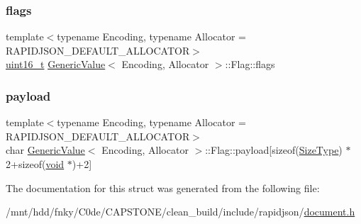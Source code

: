 \subsubsection{\texorpdfstring{flags}{flags}}
{\footnotesize\ttfamily template$<$typename Encoding, typename Allocator = R\+A\+P\+I\+D\+J\+S\+O\+N\+\_\+\+D\+E\+F\+A\+U\+L\+T\+\_\+\+A\+L\+L\+O\+C\+A\+T\+OR$>$ \\
\hyperlink{stdint_8h_a273cf69d639a59973b6019625df33e30}{uint16\+\_\+t} \hyperlink{classGenericValue}{Generic\+Value}$<$ Encoding, Allocator $>$\+::Flag\+::flags}

\mbox{\label{structGenericValue_1_1Flag_aced7ede2056a797fb80817d45634e3ea}} 
\subsubsection{\texorpdfstring{payload}{payload}}
{\footnotesize\ttfamily template$<$typename Encoding, typename Allocator = R\+A\+P\+I\+D\+J\+S\+O\+N\+\_\+\+D\+E\+F\+A\+U\+L\+T\+\_\+\+A\+L\+L\+O\+C\+A\+T\+OR$>$ \\
char \hyperlink{classGenericValue}{Generic\+Value}$<$ Encoding, Allocator $>$\+::Flag\+::payload\mbox{[}sizeof(\hyperlink{rapidjson_8h_a5ed6e6e67250fadbd041127e6386dcb5}{Size\+Type}) $\ast$2+sizeof(\hyperlink{imgui__impl__opengl3__loader_8h_ac668e7cffd9e2e9cfee428b9b2f34fa7}{void} $\ast$)+2\mbox{]}}



The documentation for this struct was generated from the following file\+:\begin{DoxyCompactItemize}
\item 
/mnt/hdd/fnky/\+C0de/\+C\+A\+P\+S\+T\+O\+N\+E/clean\+\_\+build/include/rapidjson/\hyperlink{document_8h}{document.\+h}\end{DoxyCompactItemize}
